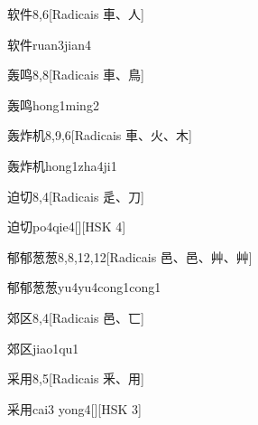 \begin{entry}{软件}{8,6}[Radicais ⾞、⼈]
  \begin{phonetics}{软件}{ruan3jian4}
  \end{phonetics}
\end{entry}

\begin{entry}{轰鸣}{8,8}[Radicais ⾞、⿃]
  \begin{phonetics}{轰鸣}{hong1ming2}
  \end{phonetics}
\end{entry}

\begin{entry}{轰炸机}{8,9,6}[Radicais ⾞、⽕、⽊]
  \begin{phonetics}{轰炸机}{hong1zha4ji1}
  \end{phonetics}
\end{entry}

\begin{entry}{迫切}{8,4}[Radicais ⾡、⼑]
  \begin{phonetics}{迫切}{po4qie4}[][HSK 4]
  \end{phonetics}
\end{entry}

\begin{entry}{郁郁葱葱}{8,8,12,12}[Radicais ⾢、⾢、⾋、⾋]
  \begin{phonetics}{郁郁葱葱}{yu4yu4cong1cong1}
  \end{phonetics}
\end{entry}

\begin{entry}{郊区}{8,4}[Radicais ⾢、⼖]
  \begin{phonetics}{郊区}{jiao1qu1}
  \end{phonetics}
\end{entry}

\begin{entry}{采用}{8,5}[Radicais ⾤、⽤]
  \begin{phonetics}{采用}{cai3 yong4}[][HSK 3]
  \end{phonetics}
\end{entry}

